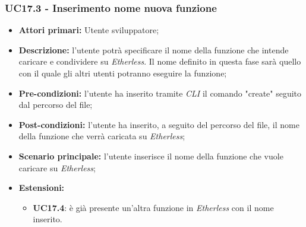 \subsubsection{UC17.3 - Inserimento nome nuova funzione}
\begin{itemize}
	\item \textbf{Attori primari:} Utente sviluppatore;
	\item \textbf{Descrizione:} l'utente potrà specificare il nome della funzione che intende caricare e condividere su \textit{Etherless}. Il nome definito in questa fase sarà quello con il quale gli altri utenti potranno eseguire la funzione; 
	\item \textbf{Pre-condizioni:} l'utente ha inserito tramite \textit{CLI\glo} il comando "create" seguito dal percorso del file;
	\item \textbf{Post-condizioni:} l'utente ha inserito, a seguito del percorso del file, il nome della funzione che verrà caricata su \textit{Etherless};
	\item \textbf{Scenario principale:} l'utente inserisce il nome della funzione che vuole caricare su \textit{Etherless};
	\item \textbf{Estensioni:} 
	\begin{itemize}
		\item \textbf{UC17.4}: è già presente un'altra funzione in \textit{Etherless} con il nome inserito.
	\end{itemize}
\end{itemize}